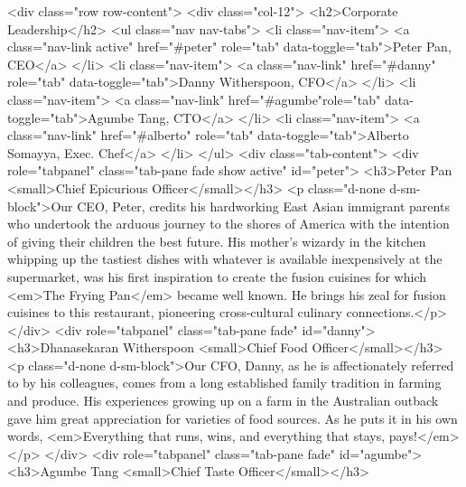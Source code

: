 <div class="row row-content">
            <div class="col-12">
                <h2>Corporate Leadership</h2>
                    <ul class="nav nav-tabs">
                        <li class="nav-item">
                        <a class="nav-link active" href="#peter"
                            role="tab" data-toggle="tab">Peter Pan, CEO</a>
                        </li>
                        <li class="nav-item">
                        <a class="nav-link" href="#danny" role="tab"
                            data-toggle="tab">Danny Witherspoon, CFO</a>
                        </li>
                        <li class="nav-item">
                        <a class="nav-link" href="#agumbe"role="tab"
                            data-toggle="tab">Agumbe Tang, CTO</a>
                        </li>
                        <li class="nav-item">
                        <a class="nav-link" href="#alberto" role="tab"
                            data-toggle="tab">Alberto Somayya, Exec. Chef</a>
                        </li>
                    </ul>
                <div class="tab-content">
                    <div role="tabpanel" class="tab-pane fade show active" id="peter">
                        <h3>Peter Pan <small>Chief Epicurious Officer</small></h3>
                        <p class="d-none d-sm-block">Our CEO, Peter, credits his hardworking East Asian immigrant parents who undertook the arduous journey to the shores of America with the intention of giving their children the best future. His mother's wizardy in the kitchen whipping up the tastiest dishes with whatever is available inexpensively at the supermarket, was his first inspiration to create the fusion cuisines for which <em>The Frying Pan</em> became well known. He brings his zeal for fusion cuisines to this restaurant, pioneering cross-cultural culinary connections.</p>
                    </div>
                    <div role="tabpanel" class="tab-pane fade" id="danny">
                        <h3>Dhanasekaran Witherspoon <small>Chief Food Officer</small></h3>
                        <p class="d-none d-sm-block">Our CFO, Danny, as he is affectionately referred to by his colleagues, comes from a long established family tradition in farming and produce. His experiences growing up on a farm in the Australian outback gave him great appreciation for varieties of food sources. As he puts it in his own words, <em>Everything that runs, wins, and everything that stays, pays!</em></p>
                    </div>
                    <div role="tabpanel" class="tab-pane fade" id="agumbe">    
                        <h3>Agumbe Tang <small>Chief Taste Officer</small></h3>
